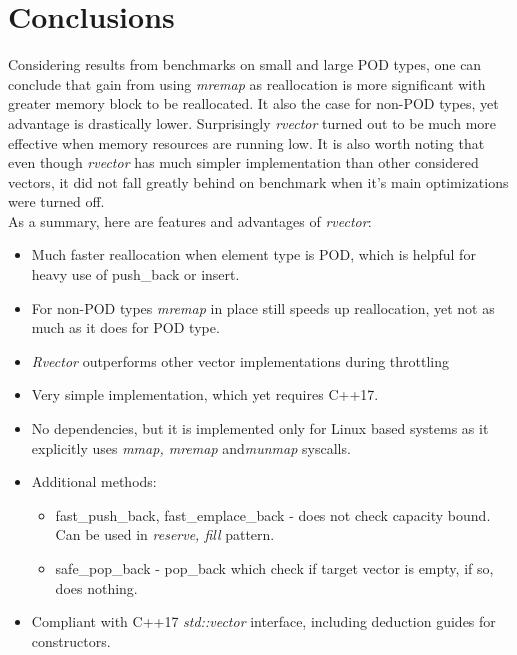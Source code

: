 \documentclass[inz, english, shortabstract]{iithesis}
\begin{document}
\chapter{Conclusions}
Considering results from benchmarks on small and large POD types, one can conclude that gain from using {\it mremap} as reallocation is more significant with greater memory block to be reallocated. It also the case for non-POD types, yet advantage is drastically lower. Surprisingly {\it rvector} turned out to be much more effective when memory resources are running low. It is also worth noting that even though {\it rvector} has much simpler implementation than other considered vectors, it did not fall greatly behind on benchmark when it's main optimizations were turned off.
\\
As a summary, here are features and advantages of {\it rvector}:
\begin{itemize}
\item Much faster reallocation when element type is POD, which is helpful for heavy use of push\_back or insert.
\item For non-POD types {\it mremap} in place still speeds up reallocation, yet not as much as it does for POD type.
\item {\it Rvector} outperforms other vector implementations during throttling
\item Very simple implementation, which yet requires C++17.
\item No dependencies, but it is implemented only for Linux based systems as it explicitly uses {\it mmap, mremap} and{\it munmap} syscalls.
\item Additional methods:
	\begin{itemize}
	\item fast\_push\_back, fast\_emplace\_back - does not check capacity bound. Can be used in {\it reserve, fill} pattern.
	\item safe\_pop\_back - pop\_back which check if target vector is empty, if so, does nothing.
	\end{itemize}
\item Compliant with C++17 {\it std::vector} interface, including deduction guides for constructors.
\end{itemize}
\end{document}
